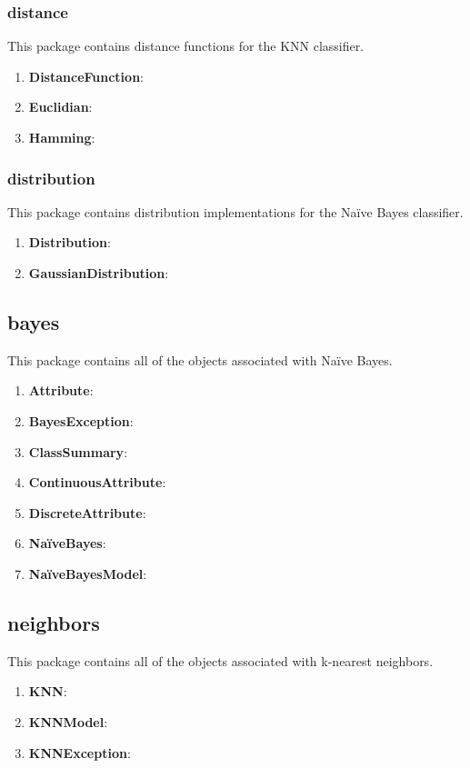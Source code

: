 \documentclass[11pt]{article}
\newcommand{\bb}{\textbf}
\begin{document}
\subsubsection{distance}
This package contains distance functions for the KNN classifier.

\begin{enumerate}[leftmargin=*]
  \item[] \bb{DistanceFunction}:
  \item[] \bb{Euclidian}:
  \item[] \bb{Hamming}:
\end{enumerate}

\subsubsection{distribution}
This package contains distribution implementations for the Naïve Bayes classifier.

\begin{enumerate}[leftmargin=*]
  \item[] \bb{Distribution}:
  \item[] \bb{GaussianDistribution}:
\end{enumerate}

\subsection{bayes}
This package contains all of the objects associated with Naïve Bayes.

\begin{enumerate}[leftmargin=*]
  \item[] \bb{Attribute}:
  \item[] \bb{BayesException}:
  \item[] \bb{ClassSummary}:
  \item[] \bb{ContinuousAttribute}:
  \item[] \bb{DiscreteAttribute}:
  \item[] \bb{NaïveBayes}:
  \item[] \bb{NaïveBayesModel}:
\end{enumerate}

\subsection{neighbors}
This package contains all of the objects associated with k-nearest neighbors.

\begin{enumerate}[leftmargin=*]
  \item[] \bb{KNN}:
  \item[] \bb{KNNModel}:
  \item[] \bb{KNNException}:
\end{enumerate}
\end{document}
